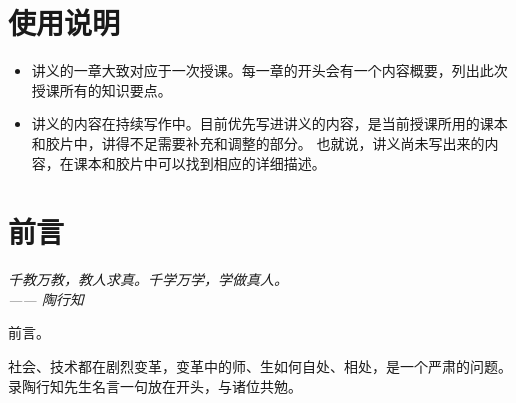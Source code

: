 \chapter*{使用说明}

\begin{itemize}
    \item 讲义的一章大致对应于一次授课。每一章的开头会有一个内容概要，列出此次授课所有的知识要点。
    \item 讲义的内容在持续写作中。目前优先写进讲义的内容，是当前授课所用的课本和胶片中，讲得不足需要补充和调整的部分。
        也就说，讲义尚未写出来的内容，在课本和胶片中可以找到相应的详细描述。
\end{itemize}



\chapter*{前言}

\begin{flushright}
    \it
    \parbox{0.7\columnwidth}{\flushright \textit{
            千教万教，教人求真。千学万学，学做真人。\\
            —— 陶行知\ }
    }
\end{flushright}

前言。

社会、技术都在剧烈变革，变革中的师、生如何自处、相处，是一个严肃的问题。录陶行知先生名言一句放在开头，与诸位共勉。
